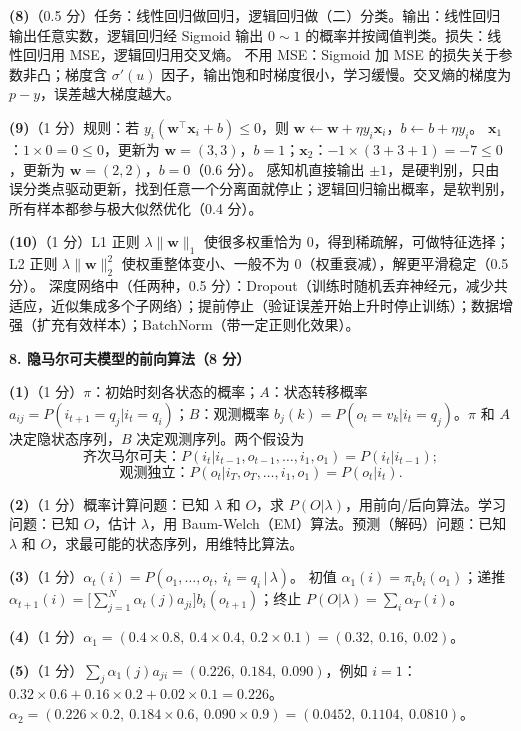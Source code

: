 \textbf{(8)}（0.5 分）任务：线性回归做回归，逻辑回归做（二）分类。输出：线性回归输出任意实数，逻辑回归经 Sigmoid 输出 $0\sim1$ 的概率并按阈值判类。损失：线性回归用 MSE，逻辑回归用交叉熵。
不用 MSE：Sigmoid 加 MSE 的损失关于参数非凸；梯度含 $\sigma'(u)$ 因子，输出饱和时梯度很小，学习缓慢。交叉熵的梯度为 $p-y$，误差越大梯度越大。

\textbf{(9)}（1 分）规则：若 $y_i(\bm w^\top\bm x_i+b)\le0$，则 $\bm w\leftarrow\bm w+\eta y_i\bm x_i$，$b\leftarrow b+\eta y_i$。
$\bm x_1$：$1\times0=0\le0$，更新为 $\bm w=(3,3)$，$b=1$；$\bm x_2$：$-1\times(3+3+1)=-7\le0$，更新为 $\bm w=(2,2)$，$b=0$（0.6 分）。
感知机直接输出 $\pm1$，是硬判别，只由误分类点驱动更新，找到任意一个分离面就停止；逻辑回归输出概率，是软判别，所有样本都参与极大似然优化（0.4 分）。

\textbf{(10)}（1 分）L1 正则 $\lambda\|\bm w\|_1$ 使很多权重恰为 0，得到稀疏解，可做特征选择；L2 正则 $\lambda\|\bm w\|_2^2$ 使权重整体变小、一般不为 0（权重衰减），解更平滑稳定（0.5 分）。
深度网络中（任两种，0.5 分）：Dropout（训练时随机丢弃神经元，减少共适应，近似集成多个子网络）；提前停止（验证误差开始上升时停止训练）；数据增强（扩充有效样本）；BatchNorm（带一定正则化效果）。

\medskip
\noindent\textbf{8. 隐马尔可夫模型的前向算法（8 分）}

\textbf{(1)}（1 分）$\pi$：初始时刻各状态的概率；$A$：状态转移概率 $a_{ij}=P(i_{t+1}=q_j|i_t=q_i)$；$B$：观测概率 $b_j(k)=P(o_t=v_k|i_t=q_j)$。$\pi$ 和 $A$ 决定隐状态序列，$B$ 决定观测序列。两个假设为
\[
\text{齐次马尔可夫：}P(i_t|i_{t-1},o_{t-1},\dots,i_1,o_1)=P(i_t|i_{t-1});\]
\[\text{观测独立：}P(o_t|i_T,o_T,\dots,i_1,o_1)=P(o_t|i_t).
\]

\textbf{(2)}（1 分）概率计算问题：已知 $\lambda$ 和 $O$，求 $P(O|\lambda)$，用前向/后向算法。学习问题：已知 $O$，估计 $\lambda$，用 Baum-Welch（EM）算法。预测（解码）问题：已知 $\lambda$ 和 $O$，求最可能的状态序列，用维特比算法。

\textbf{(3)}（1 分）$\alpha_t(i)=P(o_1,\dots,o_t,\ i_t=q_i\,|\,\lambda)$。
初值 $\alpha_1(i)=\pi_ib_i(o_1)$；递推 $\alpha_{t+1}(i)=\big[\sum_{j=1}^N\alpha_t(j)a_{ji}\big]b_i(o_{t+1})$；终止 $P(O|\lambda)=\sum_i\alpha_T(i)$。

\textbf{(4)}（1 分）$\alpha_1=(0.4\times0.8,\ 0.4\times0.4,\ 0.2\times0.1)=(0.32,\ 0.16,\ 0.02)$。

\textbf{(5)}（1 分）$\sum_j\alpha_1(j)a_{ji}=(0.226,\ 0.184,\ 0.090)$，例如 $i=1$：$0.32\times0.6+0.16\times0.2+0.02\times0.1=0.226$。
$\alpha_2=(0.226\times0.2,\ 0.184\times0.6,\ 0.090\times0.9)=(0.0452,\ 0.1104,\ 0.0810)$。

